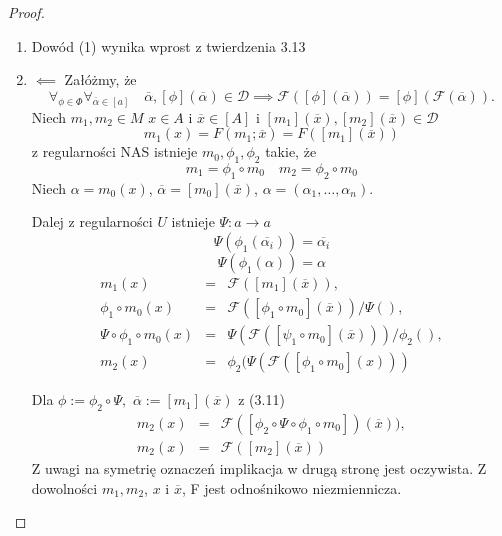 \documentclass[12pt,a4paper]{report}
\newcommand{\domkniecie}[1]{\left\lbrack{#1}\right\rbrack}
\begin{document}
\begin{proof} 
\begin{enumerate}
\item
Dowód (1) wynika wprost z twierdzenia 3.13
\item
$\impliedby$
Załóżmy, że 
\begin{equation}
\forall_{\phi \in \Phi} \forall_{\overline{\alpha} \in \domkniecie{a}} \quad \overline{\alpha}, \domkniecie{\phi}(\overline{\alpha}) \in \mathcal{D} \implies \mathcal{F}(\domkniecie{\phi}(\overline{\alpha}))=\domkniecie{\phi}(\mathcal{F}(\overline{\alpha})).
\end{equation}
Niech $m_1, m_2 \in M$ $x \in A$ i $\overline{x} \in \domkniecie{A}$ i $\domkniecie{m_1}(\overline{x}), \domkniecie{m_2}(\overline{x}) \in \mathcal{D}$
$$
m_1(x)=F(m_1;\overline{x})=F(\domkniecie{m_1}(\overline{x}))
$$
 z regularności NAS istnieje $m_0, \phi_1 , \phi_2$ takie, że 
$$ 
m_1=\phi_1\circ m_0 \quad m_2=\phi_2\circ m_0
$$
Niech $\alpha=m_0(x)$, $\overline{\alpha}=\domkniecie{m_0}(\overline{x})$, $\alpha=(\alpha_1,\dots,\alpha_n)$.

Dalej z regularności $U$ istnieje $\Psi:a \to a$
$$
 \Psi(\phi_1(\overline{\alpha_i}))=\overline{\alpha_i}
$$
$$
 \Psi(\phi_1(\alpha))=\alpha
$$
\begin{eqnarray*}
m_1(x) & = & \mathcal{F}(\domkniecie{m_1}(\overline{x})),\\ 
\phi_1 \circ m_0(x)& = & \mathcal{F}(\domkniecie{\phi_1 \circ m_0}(\overline{x}))/\Psi(),\\ 
\Psi \circ \phi_1 \circ m_0(x)&= & \Psi(\mathcal{F}(\domkniecie{\psi_1 \circ m_0}(\overline{x})))/\phi_2(),\\
m_2(x)&=&\phi_2(\Psi(\mathcal{F}(\domkniecie{\phi_1 \circ m_0}(x)))
\end{eqnarray*}

Dla $\phi:=\phi_2\circ \Psi,$ $\overline{\alpha}:=\domkniecie{m_1}(\overline{x})$ z (3.11)
\begin{eqnarray*}
m_2(x) & = & \mathcal{F}(\domkniecie{\phi_2 \circ \Psi \circ \phi_1 \circ m_0})(\overline{x})),\\
m_2(x) & = & \mathcal{F}(\domkniecie{m_2}(\overline{x}))
\end{eqnarray*}
Z uwagi na symetrię oznaczeń implikacja w drugą stronę jest oczywista. Z dowolności $m_1, m_2$, $x$ i $\overline{x}$, F jest odnośnikowo niezmiennicza.


\end{enumerate}
\end{proof}
\end{document}
